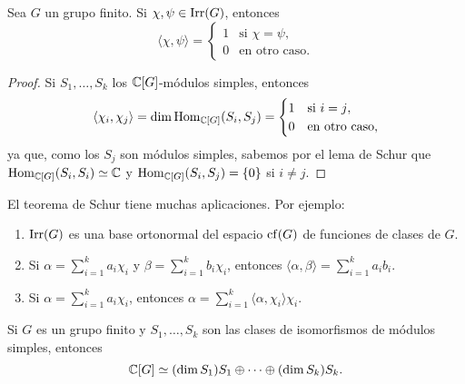 \begin{theorem}[Schur]
Sea $G$ un grupo finito. 
Si $\chi,\psi\in\operatorname{Irr}(G)$, entonces 
\[
\langle\chi,\psi\rangle=\begin{cases}
1 & \text{si $\chi=\psi$},\\
0 & \text{en otro caso}.
\end{cases}
\]
\end{theorem}

\begin{proof}
Si $S_1,\dots,S_k$ los $\mathbb{C}[G]$-módulos simples, entonces
\[
\langle\chi_i,\chi_j\rangle=\dim\operatorname{Hom}_{\mathbb{C}[G]}(S_i,S_j)=
\begin{cases}
1 & \text{si $i=j$},\\
0 & \text{en otro caso},
\end{cases}
\]
ya que, como los $S_j$ son módulos simples, sabemos por el lema de Schur que 
$\operatorname{Hom}_{\mathbb{C}[G]}(S_i,S_i)\simeq\mathbb{C}$ y $\operatorname{Hom}_{\mathbb{C}[G]}(S_i,S_j)=\{0\}$ si $i\ne j$. 
\end{proof}
  
El teorema de Schur tiene muchas aplicaciones. Por ejemplo:
\begin{enumerate}
    \item $\operatorname{Irr}(G)$ es una base ortonormal del espacio $\operatorname{cf}(G)$ de funciones de clases de $G$. 
    \item Si $\alpha=\sum_{i=1}^ka_i\chi_i$ y $\beta=\sum_{i=1}^kb_i\chi_i$, entonces
    $\langle\alpha,\beta\rangle=\sum_{i=1}^ka_ib_i$. 
    \item Si $\alpha=\sum_{i=1}^ka_i\chi_i$, entonces $\alpha=\sum_{i=1}^k\langle\alpha,\chi_i\rangle\chi_i$.
\end{enumerate}

\begin{corollary}
Si $G$ es un grupo finito y $S_1,\dots,S_k$ son las clases
de isomorfismos de módulos simples, entonces 
\[
\mathbb{C}[G]\simeq (\dim S_1)S_1\oplus\cdots\oplus (\dim S_k)S_k.
\]
\end{corollary}

